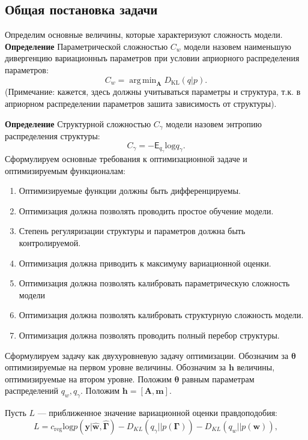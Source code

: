\documentclass[12pt]{article}
\DeclareMathOperator*{\argmin}{arg\,min}
\begin{document}
\subsection{Общая постановка задачи}
Определим основные величины, которые характеризуют сложность модели. \\
\textbf{Определение} Параметрической сложностью $C_w$ модели назовем наименьшую дивергенцию вариационныъ параметров  при условии априорного распределения параметров:
\[
    C_w = \argmin_\mathbf{A} D_\text{KL}\left(q|p\right).
\]
(Примечание: кажется, здесь должны учитываться параметры и структура, т.к. в априорном распределении параметров зашита зависимость от структуры).

\textbf{Определение} Структурной сложностью $C_\gamma$ модели назовем энтропию распределения структуры:
\[
    C_\gamma = -\mathsf{E}_{q_\gamma} \text{log}q_\gamma.
\]
Сформулируем основные требования к оптимизационной задаче и оптимизируемым функционалам:
\begin{enumerate}
\item Оптимизируемые функции должны быть дифференцируемы.
\item Оптимизация должна позволять проводить простое обучение модели.
\item Степень регуляризации структуры и параметров должна быть контролируемой.
\item Оптимизация должна приводить к максимуму вариационной оценки.
\item Оптимизация должна позволять калибровать параметрическую сложность модели
\item Оптимизация должна позволять калибровать структурную сложность модели.
\item Оптимизация должна позволять проводить полный перебор структуры.

\end{enumerate}

Сформулируем задачу как двухуровневую задачу оптимизации. Обозначим за  $\boldsymbol{\theta}$ оптимизируемые на первом уровне величины. Обозначим за $\mathbf{h}$ величины, оптимизируемые на втором уровне.
Положим $\boldsymbol{\theta}$ равным параметрам распределений $q_w, q_\gamma$. 
Положим $\mathbf{h} = [\mathbf{A}, \mathbf{m}].$

Пусть $L$ --- приближенное значение вариационной оценки правдоподобия:
\begin{equation}
    L = c_{\text{reg}}\text{log} p(\mathbf{y}|\hat{\mathbf{w}}, \hat{\boldsymbol{\Gamma}}) - {D_{KL}}(q_\gamma||p(\boldsymbol{\Gamma})) - {D_{KL}}(q_{w}||p(\mathbf{w})),
\end{equation}
\end{document}
